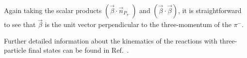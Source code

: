 \documentclass[prc,twocolumn,superscriptaddress,showpacs,amssymb,amsmath,amsfonts,aps,nofootinbib]{revtex4-1}
\begin{document}
Again taking the scalar products $(\vec \beta \cdot \vec
n_{P_{\pi^{-}}})$ and $(\vec \beta \cdot \vec  \beta)$,
it is straightforward to see that $\vec \beta$ is
the unit vector perpendicular to the 
three-momentum of the $\pi^{-}$. 






Further detailed information about the kinematics of the reactions with three-particle final states can be found in Ref.~\cite{Byckling:1971vca}.



{}

\end{document}
